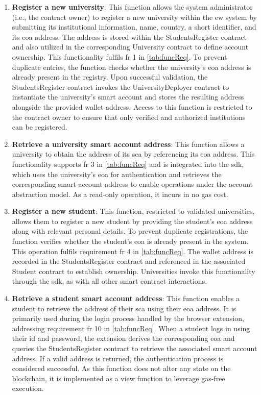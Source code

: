 \begin{enumerate}
    \item \textbf{Register a new university}: This function allows the system administrator (i.e., the contract owner) to register a new university within the \gls{ew} system by submitting its institutional information, name, country, a short identifier, and its \gls{eoa} address. The address is stored within the StudentsRegister contract and also utilized in the corresponding University contract to define account ownership. This functionality fulfils \gls{fr} 1 in \cref{tab:funcReq}. To prevent duplicate entries, the function checks whether the university's \gls{eoa} address is already present in the registry. Upon successful validation, the StudentsRegister contract invokes the UniversityDeployer contract to instantiate the university’s smart account and stores the resulting address alongside the provided wallet address. Access to this function is restricted to the contract owner to ensure that only verified and authorized institutions can be registered.

    \item \textbf{Retrieve a university smart account address}: This function allows a university to obtain the address of its \gls{sca} by referencing its \gls{eoa} address. This functionality supports \gls{fr} 3 in \cref{tab:funcReq} and is integrated into the \gls{sdk}, which uses the university's \gls{eoa} for authentication and retrieves the corresponding smart account address to enable operations under the account abstraction model. As a read-only operation, it incurs in no gas cost.
    
    \item \textbf{Register a new student}: This function, restricted to validated universities, allows them to register a new student by providing the student's \gls{eoa} address along with relevant personal details. To prevent duplicate registrations, the function verifies whether the student's \gls{eoa} is already present in the system. This operation fulfils requirement \gls{fr} 4 in \cref{tab:funcReq}. The wallet address is recorded in the StudentsRegister contract and referenced in the associated Student contract to establish ownership. Universities invoke this functionality through the \gls{sdk}, as with all other smart contract interactions.
    
    \item \textbf{Retrieve a student smart account address}: This function enables a student to retrieve the address of their \gls{sca} using their \gls{eoa} address. It is primarily used during the login process handled by the browser extension, addressing requirement \gls{fr} 10 in \cref{tab:funcReq}. When a student logs in using their \gls{id} and password, the extension derives the corresponding \gls{eoa} and queries the StudentsRegister contract to retrieve the associated smart account address. If a valid address is returned, the authentication process is considered successful. As this function does not alter any state on the blockchain, it is implemented as a view function to leverage gas-free execution.
\end{enumerate}

